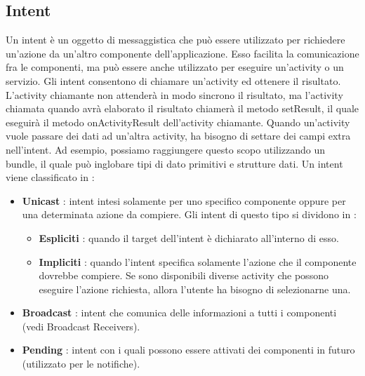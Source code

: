 \documentclass[12pt]{report}
\begin{document}
\subsection{Intent}
Un intent è un oggetto di messaggistica che può essere utilizzato per richiedere un'azione da un'altro componente dell'applicazione. Esso facilita la comunicazione fra le componenti, ma può essere anche utilizzato per eseguire un'activity o un servizio. Gli intent consentono di chiamare un'activity ed ottenere il risultato. L'activity chiamante non attenderà in modo sincrono il risultato, ma l'activity chiamata quando avrà elaborato il risultato chiamerà il metodo setResult, il quale eseguirà il metodo onActivityResult dell'activity chiamante. Quando un'activity vuole passare dei dati ad un'altra activity, ha bisogno di settare dei campi extra nell'intent. Ad esempio, possiamo raggiungere questo scopo utilizzando un bundle, il quale può inglobare tipi di dato primitivi e strutture dati. Un intent viene classificato in :
\begin{itemize}
\item \textbf{Unicast} : intent intesi solamente per uno specifico componente oppure per una determinata azione da compiere. Gli intent di questo tipo si dividono in :
\begin{itemize}
\item \textbf{Espliciti} : quando il target dell'intent è dichiarato all'interno di esso.
\item \textbf{Impliciti} : quando l'intent specifica solamente l'azione che il componente dovrebbe compiere. Se sono disponibili diverse activity che possono eseguire l'azione richiesta, allora l'utente ha bisogno di selezionarne una.
\end{itemize}
\item \textbf{Broadcast} : intent che comunica delle informazioni a tutti i componenti (vedi Broadcast Receivers).
\item \textbf{Pending} : intent con i quali possono essere attivati dei componenti in futuro (utilizzato per le notifiche).
\end{itemize}
\end{document}
